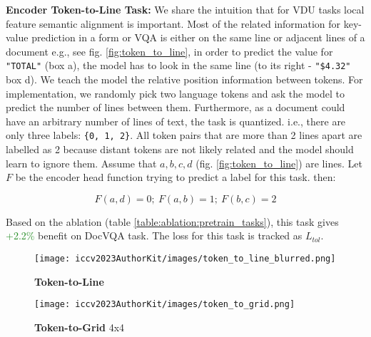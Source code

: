 \documentclass[10pt,twocolumn,letterpaper]{article}
\begin{document}
\label{sec:approach:pretrain:tok_to_line}
\noindent\textbf{Encoder Token-to-Line Task:} We share the intuition that for VDU tasks local feature semantic alignment is important. Most of the related information for key-value prediction in a form or VQA is either on the same line or adjacent lines of a document e.g., see fig. \ref{fig:token_to_line}, in order to predict the value for \verb|"TOTAL"| (box a), the model has to look in the same line (to its right - \verb|"$4.32"|  box d). We teach the model the relative position information between tokens. 
For implementation, we randomly pick two language tokens and ask the model to predict the number of lines between them. Furthermore, as a document could have an arbitrary number of lines of text, the task is quantized. i.e., there are only three labels: \verb|{0, 1, 2}|. All token pairs that are more than 2 lines apart are labelled as 2 because distant tokens are not likely related and the model should learn to ignore them. Assume that $a, b, c, d$ (fig. \ref{fig:token_to_line}) are lines. Let $F$ be the \papertitleshort encoder head function trying to predict a label for this task. then: 

\vspace{-3mm}
\begin{equation}
F(a, d) = 0 ; \
F(a, b) = 1 ; \
F(b, c) = 2
\end{equation}

\noindent Based on the ablation (table \ref{table:ablation:pretrain_tasks}), this task gives \textcolor{forestgreen}{+2.2\%}  benefit on DocVQA task. The loss for this task is tracked as $L_{tol}$.

\begin{figure}[t]\centering
\begin{minipage}[b]{0.45\linewidth}
\texttt{[image: iccv2023AuthorKit/images/token\_to\_line\_blurred.png]}
\caption{\textbf{Token-to-Line}}
\label{fig:token_to_line}
\end{minipage}
\hspace{0.05\linewidth}
\begin{minipage}[b]{0.45\linewidth}
\texttt{[image: iccv2023AuthorKit/images/token\_to\_grid.png]}
\caption{\textbf{Token-to-Grid} 4x4}
\label{fig:token_to_grid}
\end{minipage}
\end{figure}
\end{document}
